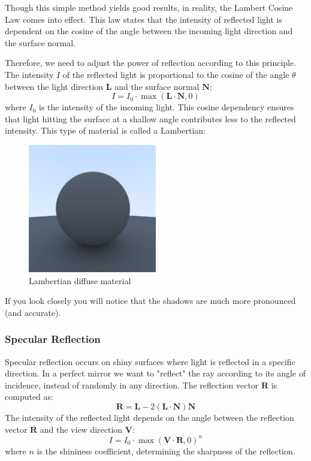 \documentclass[12pt]{article}
\begin{document}
Though this simple method yields good results, in reality, the Lambert Cosine Law comes into effect. This law states that the intensity of reflected light is dependent on the cosine of the angle between the incoming light direction and the surface normal.

Therefore, we need to adjust the power of reflection according to this principle.
The intensity \(I\) of the reflected light is proportional to the cosine of the angle \(\theta\) between the light direction \(\mathbf{L}\) and the surface normal \(\mathbf{N}\):
\[
    I = I_0 \cdot \max(\mathbf{L} \cdot \mathbf{N}, 0)
\]
where \(I_0\) is the intensity of the incoming light. This cosine dependency ensures that light hitting the surface at a shallow angle contributes less to the reflected intensity.
This type of material is called a Lambertian:

\begin{figure}[H]
    \centering
    \includegraphics[width=0.5\textwidth]{images/lambertian/lambertian_diffuse.png}
    \caption{Lambertian diffuse material}
    \label{fig:lambdiffmat}
\end{figure}

If you look closely you will notice that the shadows are much more pronounced (and accurate).

\subsubsection{Specular Reflection}
Specular reflection occurs on shiny surfaces where light is reflected in a specific direction. In a perfect mirror we want to "reflect" the ray according to its angle of incidence, instead of randomly in any direction.
The reflection vector \(\mathbf{R}\) is computed as:
\[
    \mathbf{R} = \mathbf{L} - 2(\mathbf{L} \cdot \mathbf{N})\mathbf{N}
\]
The intensity of the reflected light depends on the angle between the reflection vector \(\mathbf{R}\) and the view direction \(\mathbf{V}\):
\[
    I = I_0 \cdot \max(\mathbf{V} \cdot \mathbf{R}, 0)^n
\]
where \(n\) is the shininess coefficient, determining the sharpness of the reflection.
\end{document}
